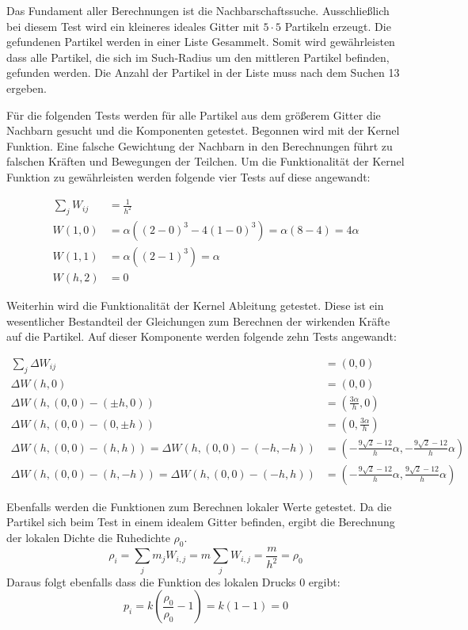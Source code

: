 \documentclass[a4paper, 12pt]{article}
\begin{document}
Das Fundament aller Berechnungen ist die Nachbarschaftssuche. Ausschließlich bei diesem Test wird ein kleineres ideales Gitter mit $5 \cdot 5$ Partikeln erzeugt.
Die gefundenen Partikel werden in einer Liste Gesammelt. Somit wird gewährleisten dass alle Partikel, die sich im Such-Radius um den mittleren Partikel befinden, gefunden werden. Die Anzahl der Partikel in der Liste muss nach dem Suchen 13 ergeben.

Für die folgenden Tests werden für alle Partikel aus dem größerem Gitter die Nachbarn gesucht und die Komponenten getestet. 
Begonnen wird mit der Kernel Funktion. Eine falsche Gewichtung der Nachbarn in den Berechnungen führt zu falschen Kräften und Bewegungen der Teilchen. Um die Funktionalität der Kernel Funktion zu gewährleisten werden folgende vier Tests \cite{huang2024journey} auf diese angewandt:

\begin{align*}
	\sum_{j} W_{ij} &= \frac{1}{h^2}\\
	W(1, 0) &= \alpha ((2-0)^3 - 4(1-0)^3) = \alpha (8 - 4) = 4\alpha\\
	W(1, 1) &= \alpha ((2-1)^3) = \alpha\\
	W(h, 2) &= 0
\end{align*}

Weiterhin wird die Funktionalität der Kernel Ableitung getestet. Diese ist ein wesentlicher Bestandteil der Gleichungen zum Berechnen der wirkenden Kräfte auf die Partikel. Auf dieser Komponente werden folgende zehn Tests \cite{huang2024journey} angewandt:

\begin{align*}
	\sum_{j} \Delta W_{ij} &= (0, 0)\\
	\Delta W(h, 0) &= (0, 0)\\
	\Delta W(h, (0, 0) - (\pm h, 0)) &= (\frac{3\alpha}{h}, 0)\\
	\Delta W(h, (0, 0) - (0, \pm h)) &= (0, \frac{3\alpha}{h})\\
	\Delta W(h, (0, 0) - (h, h)) = \Delta W(h, (0, 0) - (- h, - h))&= (-\frac{9\sqrt{2} - 12}{h} \alpha,-\frac{9\sqrt{2} - 12}{h} \alpha)\\
	\Delta W(h, (0, 0) - (h, -h)) = \Delta W(h, (0, 0) - (-h, h)) &= (-\frac{9\sqrt{2} - 12}{h} \alpha,\frac{9\sqrt{2} - 12}{h} \alpha)
\end{align*}

Ebenfalls werden die Funktionen zum Berechnen lokaler Werte getestet. Da die Partikel sich beim Test in einem idealem Gitter befinden, ergibt die Berechnung der lokalen Dichte die Ruhedichte $\rho_0$.
\[\rho_i = \sum_{j} m_j W_{i, j} = m \sum_{j} W_{i, j} = \frac{m}{h^2} = \rho_0\]
Daraus folgt ebenfalls dass die Funktion des lokalen Drucks 0 ergibt:
\[p_i = k(\frac{\rho_0}{\rho_0} - 1) = k(1 - 1) = 0\]
\end{document}
